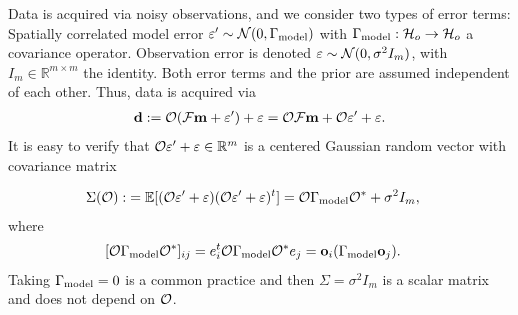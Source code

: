 Data is acquired via noisy observations, and we consider two types of
error terms: Spatially correlated model error $\varepsilon' \sim
\mathcal{N}(0,\Gamma_{\textup{model}})$ with $\Gamma_{\textup{model}}: \mathcal{H}_o \to \mathcal{H}_o$ a covariance
operator. Observation error is denoted $\varepsilon \sim \mathcal{N}(0, \sigma^2
I_m)$, with $I_m \in \mathbb{R}^{m \times m}$ the identity. Both error
terms and the prior are assumed independent of each other. Thus, data
is acquired via
\begin{align}\label{eq:inverse problem}
  \data := \obs (\fwd \param + \eps') + \eps = \obs \fwd \param + \obs \eps' + \eps.
\end{align}
It is easy to verify that $\mathcal{O} \varepsilon' + \varepsilon \in \mathbb{R}^m$ is a centered
Gaussian random vector with covariance matrix

\begin{align}\label{eq:Sigma}
  \begin{split}
    \Sigma(\obs) :&= \mathbb{E}[ (\obs \eps' + \eps) (\obs \eps' +
      \eps)^t ]
    = \obs \modcov \obs^* + \sigma^2I_m , 
  \end{split}
\end{align}
where
\begin{align}\label{eq:modcov explained}
  \begin{split}
    [\obs \modcov \obs^*]_{ij} & = e_i^t \obs \modcov \obs^* e_j 
    = \meas_i (\modcov \meas_j).%
  \end{split}
\end{align}
Taking $\Gamma_{\textup{model}} = 0$ is a common practice
\cite{Tarantola05,Kaipio2006,Vogel02} and then $\Sigma = \sigma^2I_m$
is a scalar matrix and does not depend on $\mathcal{O}$.

